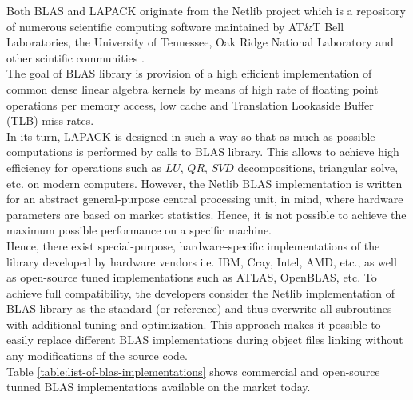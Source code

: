 Both BLAS and LAPACK originate from the Netlib project which is a repository of numerous scientific computing software maintained by AT\&T Bell Laboratories, the University of Tennessee, Oak Ridge National Laboratory and other scintific communities \cite{netlib-overview}.\\


The goal of BLAS library is provision of a high efficient implementation of common dense linear algebra kernels by means of high rate of floating point operations per memory access, low cache and Translation Lookaside Buffer (TLB) miss rates.\\


In its turn, LAPACK is designed in such a way so that as much as possible computations is performed by calls to BLAS library. This allows to achieve high efficiency for operations such as $LU$, $QR$, $SVD$ decompositions, triangular solve, etc. on modern computers. However, the Netlib BLAS implementation is written for an abstract general-purpose central processing unit, in mind, where hardware parameters are based on market statistics. Hence, it is not possible to achieve the maximum possible performance on a specific machine.\\


Hence, there exist special-purpose, hardware-specific implementations of the library developed by hardware vendors i.e. IBM, Cray, Intel, AMD, etc., as well as open-source tuned implementations such as ATLAS, OpenBLAS, etc. To achieve full compatibility, the developers consider the Netlib implementation of BLAS library as the standard (or reference) and thus overwrite all subroutines with additional tuning and optimization. This approach makes it possible to easily replace different BLAS implementations during object files linking  without any modifications of the source code.\\
 

Table \ref{table:list-of-blas-implementations} shows commercial and open-source tunned BLAS implementations available on the market today.\\

